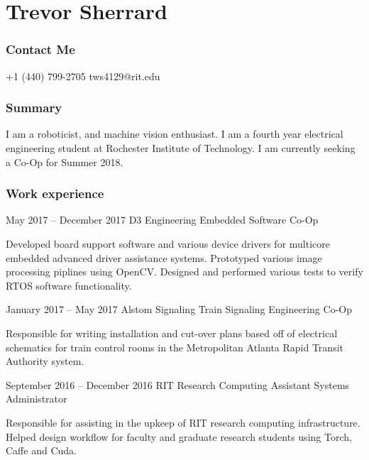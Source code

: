 \documentclass{tccv}
\begin{document}
\part{Trevor Sherrard}
\section{Contact Me}
\begin{eventlist}
    {+1 (440) 799-2705}
    {tws4129@rit.edu}
    
\end{eventlist}

\section{Summary}
I am a roboticist, and machine vision enthusiast. I am a fourth year electrical engineering student at Rochester Institute of Technology. I am currently seeking a Co-Op for Summer 2018. 

\section{Work experience}

\begin{eventlist}

\item{May 2017 -- December 2017}
     {D3 Engineering}
     {Embedded Software Co-Op}
     
Developed board support software and various device drivers for multicore embedded advanced driver assistance systems. Prototyped various image processing piplines using OpenCV. Designed and performed various tests to verify RTOS software functionality.

\item{January 2017 -- May 2017}
     {Alstom Signaling}
     {Train Signaling Engineering Co-Op}

Responsible for writing installation and cut-over plans based off of electrical schematics for train control rooms in the Metropolitan Atlanta Rapid Transit Authority system.

\item{September 2016 -- December 2016}
	 {RIT Research Computing}
	 {Assistant Systems Administrator}
	 
Responsible for assisting in the upkeep of RIT research computing infrastructure. Helped design workflow for faculty and graduate research students using Torch, Caffe and Cuda. 

\end{eventlist}
\end{document}
